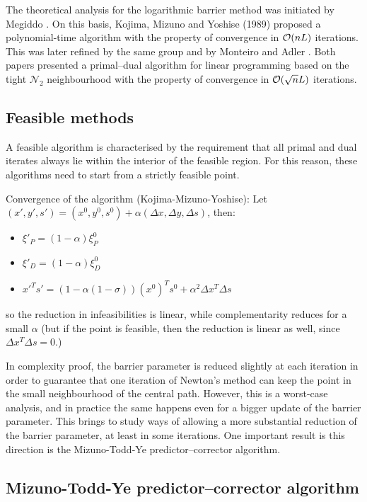 The theoretical analysis for the logarithmic barrier method was
initiated by Megiddo \cite{Megiddo}.
On this basis, Kojima, Mizuno and Yoshise (1989) proposed a
polynomial-time algorithm with the property of convergence 
in $\mathcal{O}(nL)$ iterations.
This was later refined by the same group \cite{KojimaMizunoYoshise} 
and by Monteiro and Adler \cite{MonteiroAdler89a}.
Both papers presented a primal--dual algorithm for linear programming 
based on the tight $\mathcal{N}_2$ neighbourhood
with the property of convergence in $\mathcal{O}(\sqrt{n}L)$ iterations.

%
%
\subsection{Feasible methods}

A feasible algorithm is characterised by the requirement that
all primal and dual iterates always lie within the interior 
of the feasible region. For this reason, these algorithms 
need to start from a strictly feasible point. 

Convergence of the algorithm (Kojima-Mizuno-Yoshise): 
Let $(x', y', s') = (x^0, y^0, s^0) + \alpha(\Delta x, \Delta y, \Delta s)$, 
then:
\begin{itemize}
\item $\xi'_P = (1-\alpha) \xi^0_P$
\item $\xi'_D = (1-\alpha) \xi^0_D$
\item $x'^Ts' = (1-\alpha (1 -\sigma))(x^0)^Ts^0 +\alpha^2 \Delta x^T \Delta s$
\end{itemize}
so the reduction in infeasibilities is linear, while complementarity reduces
for a small $\alpha$ (but if the point is feasible, then the reduction is
linear as well, since $\Delta x^T \Delta s = 0$.)

In complexity proof, the barrier parameter is reduced slightly at
each iteration in order to guarantee that one iteration of Newton's
method can keep the point in the small neighbourhood of the central path.
However, this is a worst-case analysis, and in practice the same happens
even for a bigger update of the barrier parameter. This brings to
study ways of allowing a more substantial reduction of the barrier
parameter, at least in some iterations. One important result is this
direction is the Mizuno-Todd-Ye predictor--corrector algorithm.

%
%
\subsection{Mizuno-Todd-Ye predictor--corrector algorithm}

